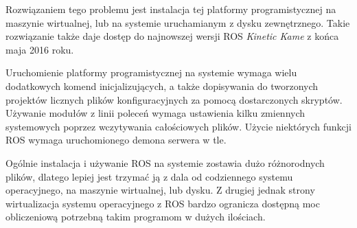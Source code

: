Rozwiązaniem tego problemu jest instalacja tej platformy programistycznej na maszynie wirtualnej, lub na systemie uruchamianym z dysku zewnętrznego. 
Takie rozwiązanie także daje dostęp do najnowszej wersji ROS \emph{Kinetic Kame} z końca maja 2016 roku.

Uruchomienie platformy programistycznej na systemie wymaga wielu dodatkowych komend inicjalizujących, a także dopisywania do tworzonych projektów licznych plików konfiguracyjnych za pomocą dostarczonych skryptów.
Używanie modułów z linii poleceń wymaga ustawienia kilku zmiennych systemowych poprzez wczytywania całościowych plików.
Użycie niektórych funkcji ROS wymaga uruchomionego demona serwera w tle.

Ogólnie instalacja i używanie ROS na systemie zostawia dużo różnorodnych plików, dlatego lepiej jest trzymać ją z dala od codziennego systemu operacyjnego, na maszynie wirtualnej, lub dysku.
Z drugiej jednak strony wirtualizacja systemu operacyjnego z ROS bardzo ogranicza dostępną moc obliczeniową potrzebną takim programom w dużych ilościach.

